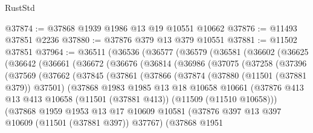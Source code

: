 \begin{lexlean}{RustStd}
\begin{coremodule}
@37874 := @37868 @1939 @1986 @13 @19 @10551 @10662
@37876 := @11493 @37851 @2236
@37880 := @37876 @379 @13 @379 @10551
@37881 := @11502 @37851
@37964 := @36511
    (@36536
      (@36577
        (@36579
          (@36581
            (@36602
              (@36625
                (@36642
                  (@36661
                    (@36672
                      (@36676
                        (@36814
                          (@36986
                            (@37075
                              (@37258
                                (@37396
                                  (@37569
                                    (@37662
                                      (@37845
                                        (@37861
                                          (@37866
                                            (@37874
                                              (@37880 (@11501 (@37881 @379)) @37501)
                                              (@37868
                                                @1983
                                                @1985
                                                @13
                                                @18
                                                @10658
                                                @10661
                                                (@37876
                                                  @413
                                                  @13
                                                  @413
                                                  @10658
                                                  (@11501 (@37881 @413))
                                                  (@11509 (@11510 @10658)))
                                                (@37868
                                                  @1959
                                                  @1953
                                                  @13
                                                  @17
                                                  @10609
                                                  @10581
                                                  (@37876
                                                    @397
                                                    @13
                                                    @397
                                                    @10609
                                                    (@11501 (@37881 @397))
                                                    @37767)
                                                  (@37868
                                                    @1951

\end{coremodule}
\end{lexlean}
